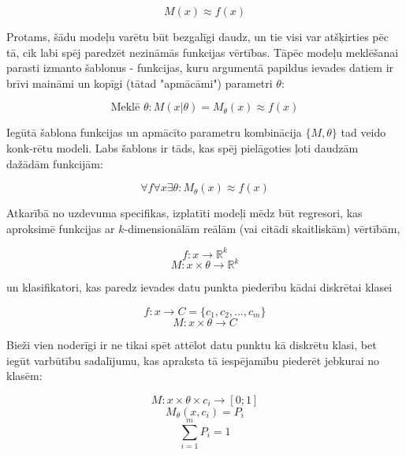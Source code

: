 \documentclass[12pt, a4paper]{article}
\numberwithin{equation}{section} %
\begin{document}
\begin{equation} 
    M(x) \approx f(x)
\end{equation}

Protams, šādu modeļu varētu būt bezgalīgi daudz, un tie visi var atšķirties pēc tā, cik labi spēj paredzēt nezināmās funkcijas vērtības. Tāpēc modeļu meklēšanai parasti izmanto šablonus - funkcijas, kuru argumentā papildus ievades datiem ir brīvi maināmi un kopīgi (tātad "apmācāmi") parametri $\theta$:

\begin{equation} 
    \text{Meklē } \theta:M(x \vert \theta) = M_{\theta}(x)  \approx f(x)
\end{equation}

Iegūtā šablona funkcijas un apmācīto parametru kombinācija $\lbrace M, \theta \rbrace$ tad veido konk-rētu modeli. Labs šablons ir tāds, kas spēj pielāgoties ļoti daudzām dažādām funkcijām:

\begin{equation} 
    \forall f \forall x \exists \theta:M_{\theta}(x)\approx f(x)
\end{equation}

Atkarībā no uzdevuma specifikas, izplatīti modeļi mēdz būt regresori, kas aproksimē funkcijas ar $k$-dimensionālām reālām (vai citādi skaitliskām) vērtībām,

\begin{equation} 
    f:x \rightarrow \mathbb{R}^k
\end{equation}
\begin{equation} 
    M: x \times \theta \rightarrow \mathbb{R}^k
\end{equation}

un klasifikatori, kas paredz ievades datu punkta piederību kādai diskrētai klasei

\begin{equation} 
    f:x \rightarrow C = \lbrace c_1, c_2, ..., c_m \rbrace
\end{equation}
\begin{equation} 
     M: x \times \theta \rightarrow C
\end{equation}

Bieži vien noderīgi ir ne tikai spēt attēlot datu punktu kā diskrētu klasi, bet iegūt varbūtību sadalījumu, kas apraksta tā iespējamību piederēt jebkurai no klasēm:

\begin{equation} 
    M: x \times \theta \times c_i \rightarrow [0; 1]
\end{equation}
\begin{equation} 
    M_{\theta}(x, c_i) = P_i
\end{equation}
\begin{equation} 
    \sum_{i=1}^m P_i = 1
\end{equation}
\end{document}
